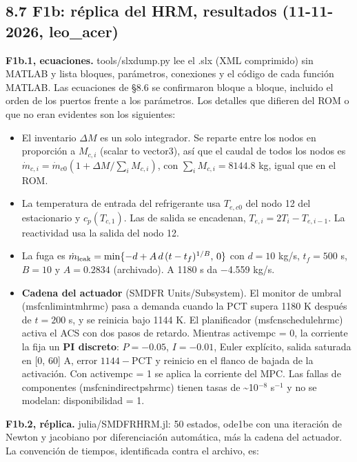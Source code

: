 \documentclass[11pt,a4paper]{article}
\newcommand{\codeus}{\textunderscore\allowbreak}
\newcommand{\code}[1]{{\small\ttfamily\let\_\codeus #1}}
\begin{document}
\subsection*{8.7 F1b: réplica del HRM, resultados (11-11-2026, leo\_acer)}
\textbf{F1b.1, ecuaciones.} \code{tools/slx\_dump.py} lee el \code{.slx} (XML comprimido) sin MATLAB y lista bloques, parámetros, conexiones y el código de cada función MATLAB. Las ecuaciones de \S{}8.6 se confirmaron bloque a bloque, incluido el orden de los puertos frente a los parámetros. Los detalles que difieren del ROM o que no eran evidentes son los siguientes:

\begin{itemize}
\item El inventario $\Delta M$ es un solo integrador. Se reparte entre los nodos en proporción a $M_{c,i}$ (\code{scalar to vector3}), así que el caudal de todos los nodos es $\dot m_{c,i}=\dot m_{c0}(1+\Delta M/\sum_iM_{c,i})$, con $\sum_iM_{c,i}=8144.8$ kg, igual que en el ROM.
\item La temperatura de entrada del refrigerante usa $T_{e,c0}$ del nodo 12 del estacionario y $c_p(T_{c,1})$. Las de salida se encadenan, $T_{e,i}=2T_i-T_{e,i-1}$. La reactividad usa la salida del nodo 12.
\item La fuga es $\dot m_{\rm leak}=\min\{-d+A\,d\,(t-t_f)^{1/B},\,0\}$ con $d=10$ kg/s, $t_f=500$ s, $B=10$ y $A=0.2834$ (archivado). A 1180 s da $-$4.559 kg/s.
\item \textbf{Cadena del actuador} (\code{SMDFR Units/Subsystem}). El monitor de umbral (\code{msfcn\_limintm\_hrm\_c}) pasa a demanda cuando la PCT supera 1180 K después de $t=200$ s, y se reinicia bajo 1144 K. El planificador (\code{msfcn\_schedule\_hrm\_c}) activa el ACS con dos pasos de retardo. Mientras \code{active\_mpc} = 0, la corriente la fija un \textbf{PI discreto}: $P=-0.05$, $I=-0.01$, Euler explícito, salida saturada en [0, 60] A, error $1144-\mathrm{PCT}$ y reinicio en el flanco de bajada de la activación. Con \code{active\_mpc} = 1 se aplica la corriente del MPC. Las fallas de componentes (\code{msfcn\_indirectps\_hrm\_c}) tienen tasas de \textasciitilde{}10$^{-8}$ s$^{-1}$ y no se modelan: disponibilidad = 1.
\end{itemize}

\textbf{F1b.2, réplica.} \code{julia/SMDFRHRM.jl}: 50 estados, \code{ode1be} con una iteración de Newton y jacobiano por diferenciación automática, más la cadena del actuador. La convención de tiempos, identificada contra el archivo, es:
\end{document}
